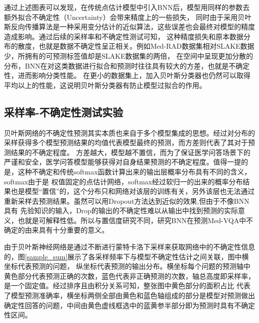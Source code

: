 通过上述图表可以发现，在传统点估计模型中引入BNN后，模型用同样的参数去额外拟合不确定性（Uncertainty）会带来精度上的一些损失，
同时由于采用贝叶斯反向传播算法是一种采用变分估计的近似算法，这些误差也会最终对模型的精度造成影响。通过后续的采样率和不确定性测试可知，
这种精度损失和原本数据分布的散度，也就是数据不确定性呈正相关。例如Med-RAD数据集相对SLAKE数据少，所拥有的可预测标签值却是SLAKE数据集的两倍，
在空间中呈现更加分散的分布，BNN在对这类数据进行拟合和预测时往往具有较大的方差，也就是不确定性，进而影响分类性能。
在更小的数据集上，加入贝叶斯分类器也仍然可以取得平均以上的性能，这说明贝叶斯分类器有防止模型过拟合的作用。


\subsection{采样率-不确定性测试实验}
贝叶斯网络的不确定性预测其实本质也来自于多个模型集成的思想。经过对分布的采样获得多个模型预测结果的均值代表模型最终的预测，而方差则代表了其对于预测结果的不确定程度。
方差越大，模型越不置信，而为了保证医学问答场景下的严谨和安全，医学问答模型能够获得对自身结果预测的不确定程度。值得一提的是，这种不确定和传统softmax函数计算出来的输出层概率分布具有不同的含义，softmax由于是
权值固定的点估计网络，softmax经过软归一的出来的概率分布结果也是模型“置信”的，这个分布只和网络对该层的训练有关，另外该层也无法通过重新采样去预测结果。虽然可以用Dropout方法达到近似的效果\cite{},但由于不像BNN具有
先验知识的输入，Drop的输出的不确定性难以从输出中找到预测的实际意义，也就是可解释性低。所以与置信度研究不同，研究BNN在预测Med-VQA中不确定的由来具有十分重要的意义。

由于贝叶斯神经网络是通过不断进行蒙特卡洛下采样来获取网络中的不确定性信息的，图\ref{sample_sum}展示了各采样频率下与模型不确定性估计之间关联，图中横坐标代表预测的问题，
纵坐标代表预测的输出分布。横坐标每个问题的预测轴中黄色部分代表预测正确的次数，蓝色代表非正确预测的次数，轴总高度即采样率，是一个固定值。经过排序且由积分关系可知，整张图中黄色部分的面积占比
代表了模型预测准确率，横坐标两侧全部由黄色和蓝色轴组成的部分是模型对预测做出确定性回答的问题，中间由黄色虚线框选中的蓝黄参半部分即为预测时具有不确定性区间。

